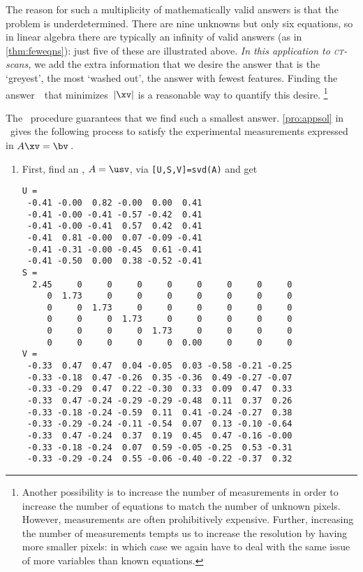 \begin{example}
The reason for such a multiplicity of mathematically valid answers is that the problem is underdetermined.  
There are nine unknowns but only six equations, so in linear algebra there are typically an infinity of valid answers (as in \cref{thm:feweqns}): just five of these are illustrated above.
\emph{In this application to \textsc{ct}-scans,} we add the extra information that we desire the answer that is the `greyest', the most `washed out', the answer with fewest features.
Finding the answer~\xv\ that minimizes~\(|\xv|\) is a reasonable way to quantify this desire.%
\footnote{Another possibility is to increase the number of measurements in order to increase the number of equations to match the number of unknown pixels.
However, measurements are often prohibitively expensive.
Further, increasing the number of measurements tempts us to increase the resolution by having more smaller pixels: in which case we again have to deal with the same issue of more variables than known equations.}

The \svd\ procedure guarantees that we find such a smallest answer.
\cref{pro:appsol} in \script\ gives the following process to satisfy the experimental measurements expressed in \(A\xv=\bv\)\,.
\begin{enumerate}
\item First, find an \svd, \(A=\usv\), via \verb|[U,S,V]=svd(A)| and get \twodp
\setbox\ajrqrbox\hbox{}%
\marginajrbox%
\begin{small}
\begin{verbatim}
U =
 -0.41 -0.00  0.82 -0.00  0.00  0.41
 -0.41 -0.00 -0.41 -0.57 -0.42  0.41
 -0.41 -0.00 -0.41  0.57  0.42  0.41
 -0.41  0.81 -0.00  0.07 -0.09 -0.41
 -0.41 -0.31 -0.00 -0.45  0.61 -0.41
 -0.41 -0.50  0.00  0.38 -0.52 -0.41
S =
  2.45     0     0     0     0     0     0     0     0
     0  1.73     0     0     0     0     0     0     0
     0     0  1.73     0     0     0     0     0     0
     0     0     0  1.73     0     0     0     0     0
     0     0     0     0  1.73     0     0     0     0
     0     0     0     0     0  0.00     0     0     0
V =
 -0.33  0.47  0.47  0.04 -0.05  0.03 -0.58 -0.21 -0.25
 -0.33 -0.18  0.47 -0.26  0.35 -0.36  0.49 -0.27 -0.07
 -0.33 -0.29  0.47  0.22 -0.30  0.33  0.09  0.47  0.33
 -0.33  0.47 -0.24 -0.29 -0.29 -0.48  0.11  0.37  0.26
 -0.33 -0.18 -0.24 -0.59  0.11  0.41 -0.24 -0.27  0.38
 -0.33 -0.29 -0.24 -0.11 -0.54  0.07  0.13 -0.10 -0.64
 -0.33  0.47 -0.24  0.37  0.19  0.45  0.47 -0.16 -0.00
 -0.33 -0.18 -0.24  0.07  0.59 -0.05 -0.25  0.53 -0.31
 -0.33 -0.29 -0.24  0.55 -0.06 -0.40 -0.22 -0.37  0.32
\end{verbatim}
\end{small}



\end{enumerate}
\end{example}

